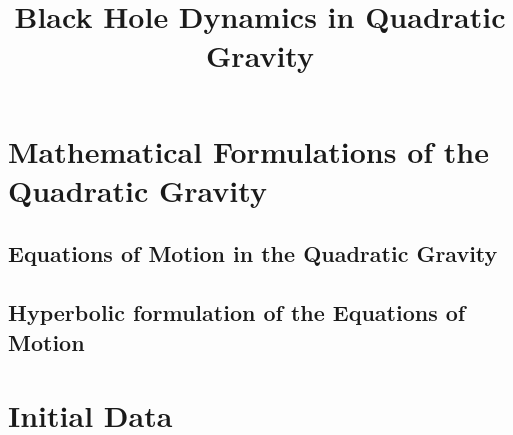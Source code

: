 \documentclass[prd]{revtex4}
\begin{document}
\title{Black Hole Dynamics in Quadratic Gravity}



\maketitle

\section{Mathematical Formulations of the Quadratic Gravity}

\subsection{Equations of Motion in the Quadratic Gravity}

\subsection{Hyperbolic formulation of the Equations of Motion}

\section{Initial Data}
\end{document}
